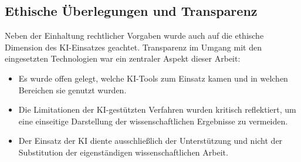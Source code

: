 \subsection*{Ethische Überlegungen und Transparenz}
Neben der Einhaltung rechtlicher Vorgaben wurde auch auf die ethische Dimension des KI-Einsatzes geachtet. Transparenz im Umgang mit den eingesetzten Technologien war ein zentraler Aspekt dieser Arbeit:
\begin{itemize}
    \item Es wurde offen gelegt, welche KI-Tools zum Einsatz kamen und in welchen Bereichen sie genutzt wurden.
    \item Die Limitationen der KI-gestützten Verfahren wurden kritisch reflektiert, um eine einseitige Darstellung der wissenschaftlichen Ergebnisse zu vermeiden.
    \item Der Einsatz der KI diente ausschließlich der Unterstützung und nicht der Substitution der eigenständigen wissenschaftlichen Arbeit.
\end{itemize}
